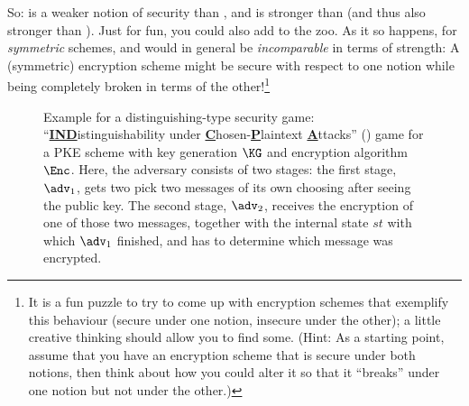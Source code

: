         So: \ownma is a weaker notion of security than \owcpa, and \indcpa
          is stronger than \owcpa (and thus also stronger than \ownma). 
          Just for fun, you could also add \indnma to the zoo.
          As it so happens, for \emph{symmetric} schemes, \owcpa and \indnma would in general be
          \emph{incomparable} in terms of strength: A (symmetric) encryption scheme
          might be secure with respect to one notion while being
          completely broken in terms of the other!\footnote{
            It is a fun puzzle to try to come up with encryption schemes that exemplify this
            behaviour (secure under one notion, insecure under the other);
            a little creative thinking should allow you to find some. (Hint:
            As a starting point, assume that you have an encryption scheme that
            is secure under both notions, then think
            about how you could alter it so that it ``breaks'' under one notion
            but not under the other.)
          }
      	
        
        
        \begin{figure}[t]
        	\begin{center}
        	\end{center}
        	\caption{\label{fig:example-game}
        		Example for a distinguishing-type security game:
        		``\textbf{\underline{IND}}istinguishability under \textbf{\underline{C}}hosen-\textbf{\underline{P}}laintext \textbf{\underline{A}}ttacks'' (\indcpa) game for
        		a PKE scheme with key generation $\KG$ and encryption algorithm $\Enc$.
        		Here, the adversary consists of two stages: the first stage, $\adv_1$, gets two pick two messages of its own choosing after seeing the public key.
        		The second stage, $\adv_2$, receives the encryption of one of those two messages, together with the internal state $st$ with which  $\adv_1$ finished,
        		and has to determine which message was encrypted.
        	}
        \end{figure}
        
